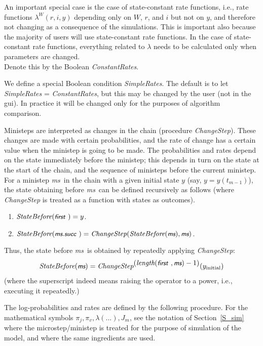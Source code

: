\documentclass[a4paper,12pt,fleqn]{article}
\newcommand{\nnm}[1]{\textsf{\small\textit{#1}\ }}
\newcommand{\ms}{\textsl{\textsf{\small ms}}} %
\newcommand{\adda}[1]{{#1}}  %
\newcommand{\addaa}[1]{{\textcolor[named]{Black}{#1}}}  %
\begin{document}
\adda{An important special case is the case of state-constant rate functions, i.e., rate functions
$\lambda^W(r,i,y)$ depending only on $W$, $r$, and $i$ but not on $y$,
and therefore not changing as a consequence of the simulations.
This is important also because the majority of users will use
state-constant rate functions.
In the case of state-constant rate functions, everything related to $\lambda$ needs to be
calculated only when parameters are changed.\\
Denote this by the Boolean \textit{ConstantRates}.
}

\adda{We define a special Boolean condition \textit{SimpleRates}.
The default is to let \\
\textit{SimpleRates} = \textit{ConstantRates}, but this
may be changed by the user (not in the gui).
In practice it will be changed only for the purposes of algorithm comparison.
}

Ministeps are interpreted as changes in the chain (procedure \textit{ChangeStep}).
These changes are made with certain probabilities, and the
rate of change has a certain value when the ministep is going to be made.
The probabilities and rates depend on the state immediately before the ministep;
this depends in turn on the state at the start of the chain, and the
sequence of ministeps before the current ministep.
For a ministep \ms \ in the chain with a given initial state $y$
(say, $y = y(t_{m-1})$), the state obtaining before \ms \
can be defined recursively as follows (where \textit{ChangeStep} is treated
as a function with states as outcomes).
\begin{enumerate}
\item $\textit{StateBefore}(\nnm{first}) = y$.
\item $\textit{StateBefore}(\ms.\nnm{succ}) = \textit{ChangeStep}(\textit{StateBefore}(\ms),\ms)$.
\end{enumerate}
Thus, the state before \ms \ is obtained by repeatedly applying \textit{ChangeStep}:
\addaa{\[
\textit{StateBefore}(\ms) =
      \textit{ChangeStep}^{\displaystyle ( \textit{\normalsize length}(\nnm{first},\ms)\displaystyle -1)}(y_{\text{initial}})
\]}
(where the superscript indeed means raising the operator to a power,
i.e., executing it repeatedly.)

The log-probabilities and rates are defined by the following procedure.
For the mathematical symbols $\pi_j, \pi_v, \lambda(...), J_m$, see
the notation of Section~\ref{S_sim} where the microstep/ministep
is treated for the purpose of simulation of the model,
and where the same ingredients are used.
\end{document}
